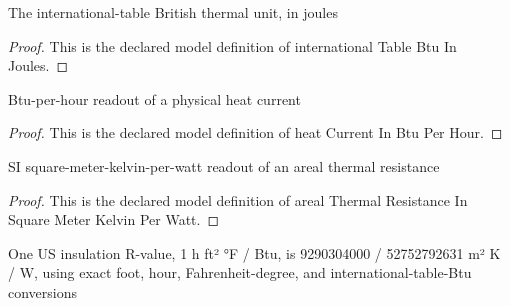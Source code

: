 \begin{definition}
  \label{def:physics:phyx-mini-0487:phyxminiproblems-problemphyxmini0487-internationaltablebtuinjoules}
  The international-table British thermal unit, in joules
\end{definition}
\begin{proof}
  This is the declared model definition of international Table Btu In Joules.
\end{proof}
\begin{definition}
  \label{def:physics:phyx-mini-0487:phyxminiproblems-problemphyxmini0487-heatcurrentinbtuperhour}
  Btu-per-hour readout of a physical heat current
\end{definition}
\begin{proof}
  This is the declared model definition of heat Current In Btu Per Hour.
\end{proof}
\begin{definition}
  \label{def:physics:phyx-mini-0487:phyxminiproblems-problemphyxmini0487-arealthermalresistanceinsquaremeterkelvinperwatt}
  SI square-meter-kelvin-per-watt readout of an areal thermal resistance
\end{definition}
\begin{proof}
  This is the declared model definition of areal Thermal Resistance In Square Meter Kelvin Per Watt.
\end{proof}
\begin{definition}
  \label{def:physics:phyx-mini-0487:phyxminiproblems-problemphyxmini0487-oneimperialrvalueinsquaremeterkelvinperwatt}
  One US insulation R-value, 1 h ft² °F / Btu, is 9290304000 / 52752792631 m² K / W, using exact foot, hour, Fahrenheit-degree, and international-table-Btu conversions
\end{definition}
